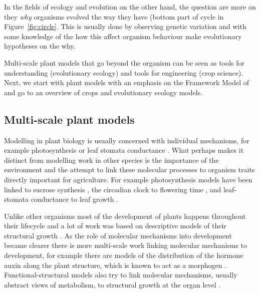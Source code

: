 In the fields of ecology and evolution on the other hand, the question are more
on they \emph{why} organisms evolved the way they have (bottom part of cycle in
Figure~\ref{fig:circle}. This is usually done by observing genetic variation and
with some knowledge of the how this affect organism behaviour make evolutionary
hypotheses on the why.

Multi-scale plant models that go beyond the organism can be seen as tools for
understanding (evolutionary ecology) and tools for engineering (crop
science). Next, we start with plant models with an emphasis on the Framework
Model of \citet{chew_multiscale_2014} and go to an overview of crops and
evolutionary ecology models.

\subsection{Multi-scale plant models}
Modelling in plant biology is usually concerned with individual mechanisms, for
example photosynthesis \citep{farquhar_biochemical_1980} or leaf stomata
conductance \citep{tardieu1993integration}. What perhaps makes it distinct from
modelling work in other species is the importance of the environment and the
attempt to link these molecular processes to organism traits directly important
for agriculture. For example photosynthesis models have been linked to sucrose
synthesis \citep{zhu_e-photosynthesis:_2013}, the circadian clock to flowering
time \citep{salazar_prediction_2009}, and leaf-stomata conductance to leaf
growth \citep{tardieu2015modelling}.

Unlike other organisms most of the development of plants happens throughout
their lifecycle and a lot of work was based on descriptive models of their
structural growth \citep{mundermann_quantitative_2005}. As the role of molecular
mechanisms into development became clearer there is more multi-scale work
linking molecular mechanisms to development, for example there are models of the
distribution of the hormone auxin along the plant structure, which is known to
act as a morphogen \citep{prusinkiewicz2009control,
  jonsson2006auxin}. Functional-structural models also try to link molecular
mechanisms, usually abstract views of metabolism, to structural growth at the
organ level \citep{christophe_model-based_2008}.

